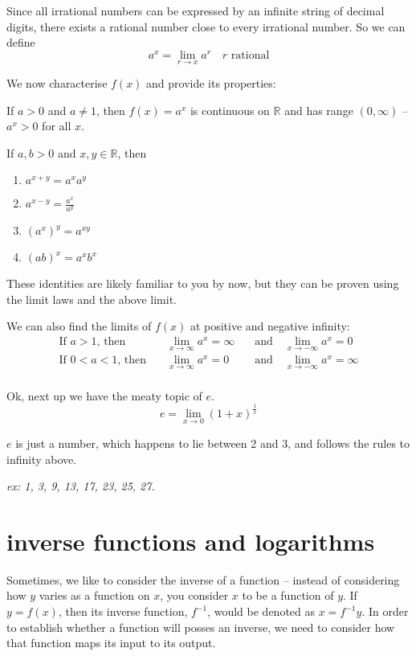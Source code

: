 \documentclass[10pt,a4paper]{report}
\begin{document}
Since all irrational numbers can be expressed by an infinite string of decimal digits, there exists a rational number close to every irrational number. So we can define
$$
	a^x = \lim_{r \to x} a^r \quad r \text{ rational}
$$

We now characterise $f(x)$ and provide its properties:

\noindent If $a > 0$ and $a \ne 1$, then $f(x) = a^x$ is continuous on $\mathbb{R}$ and has range $(0, \infty)$ -- $a^x > 0$ for all $x$.

If $a, b > 0$ and $x, y \in \mathbb{R}$, then

\begin{enumerate}
	\item $a^{x + y} = a^x a^y$
	\item $a^{x - y} = \frac{a^x}{a^y}$
	\item $(a^x)^y = a^{xy}$
	\item $(ab)^x = a^x b^x$
\end{enumerate}

These identities are likely familiar to you by now, but they can be proven using the limit laws and the above limit.

We can also find the limits of $f(x)$ at positive and negative infinity:
\begin{align*}
	\text{If } a > 1 \text{, then} \quad & \lim_{x \to \infty} a^x = \infty \quad & \text{and} \quad \lim_{x \to -\infty} a^x = 0 \\
	\text{If } 0 < a < 1 \text{, then} \quad & \lim_{x \to \infty} a^x = 0 \quad & \text{and} \quad \lim_{x \to -\infty} a^x = \infty \\
\end{align*}

Ok, next up we have the meaty topic of $e$.
$$
	e = \lim_{x \to 0} (1 + x)^\frac{1}{x}
$$

$e$ is just a number, which happens to lie between 2 and 3, and follows the rules to infinity above.

\emph{ex: 1, 3, 9, 13, 17, 23, 25, 27.}


\section{inverse functions and logarithms}

Sometimes, we like to consider the inverse of a function -- instead of considering how $y$ varies as a function on $x$, you consider $x$ to be a function of $y$. If $y = f(x)$, then its inverse function, $f^{-1}$, would be denoted as $x = f^{-1}y$. In order to establish whether a function will posses an inverse, we need to consider how that function maps its input to its output.
\end{document}
